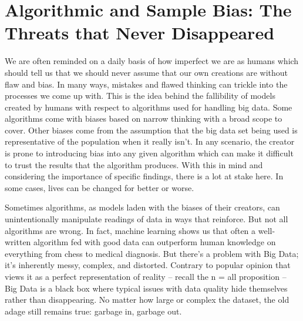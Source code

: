 \documentclass[sigconf]{acmart}
\begin{document}
\section{Algorithmic and Sample Bias: The Threats that Never Disappeared}

	We are often reminded on a daily basis of how imperfect we are as humans which should tell us that we should never assume that our own creations are without flaw and bias. In many ways, mistakes and flawed thinking can trickle into the processes we come up with. This is the idea behind the fallibility of models created by humans with respect to algorithms used for handling big data. Some algorithms come with biases based on narrow thinking with a broad scope to cover. Other biases come from the assumption that the big data set being used is representative of the population when it really isn't. In any scenario, the creator is prone to introducing bias into any given algorithm which can make it difficult to trust the results that the algorithm produces. With this in mind and considering the importance of specific findings, there is a lot at stake here. In some cases, lives can be changed for better or worse.

Sometimes algorithms, as models laden with the biases of their creators, can unintentionally manipulate readings of data in ways that reinforce. But not all algorithms are wrong. In fact, machine learning shows us that often a well-written algorithm fed with good data can outperform human knowledge on everything from chess to medical diagnosis. But there's a problem with Big Data; it's inherently messy, complex, and distorted. Contrary to popular opinion that views it as a perfect representation of reality -- recall the n = all proposition -- Big Data is a black box where typical issues with data quality hide themselves rather than disappearing. No matter how large or complex the dataset, the old adage still remains true: garbage in, garbage out. 
\end{document}
